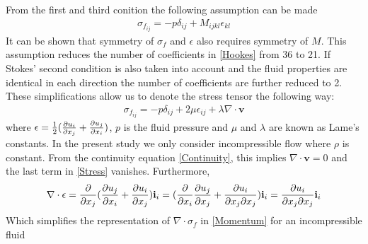 From the first and third conition the following assumption can be made
\begin{align}
\sigma_{f_{ij}} = -p\delta_{ij} + M_{ijkl}\epsilon_{kl} \label{Hookes}
\end{align}
It can be shown that symmetry of $\sigma_f$ and $\epsilon$ also requires symmetry of $M$. This assumption reduces the number of coefficients in \eqref{Hookes} from 36 to 21. If Stokes' second condition is also taken into account and the fluid properties are identical in each direction the number of coefficients are further reduced to 2. These simplifications allow us to denote the stress tensor the following way:
\begin{align}
\sigma_{f_{ij}} = -p\delta_{ij} + 2\mu\epsilon_{ij} + \lambda \nabla \cdot \mathbf{v} \label{Stress}
\end{align}
where $\epsilon = \frac{1}{2}(\frac{\partial u_i}{\partial x_j} + \frac{\partial u_j}{\partial x_i})$, $p$ is the fluid pressure and $\mu$ and $\lambda$ are known as Lame's constants. In the present study we only consider incompressible flow where $\rho$ is constant. From the continuity equation \eqref{Continuity}, this implies $\nabla \cdot \mathbf{v} = 0$ and the last term in \eqref{Stress} vanishes. Furthermore, 
\begin{align*}
\nabla \cdot \epsilon = \frac{\partial }{\partial x_j}(\frac{\partial u_j}{\partial x_i} + \frac{\partial u_i}{\partial x_j})\mathbf{i}_i = (\frac{\partial }{\partial x_i}\frac{\partial u_j}{\partial x_j} + \frac{\partial u_i}{\partial x_j \partial x_j})\mathbf{i}_i = \frac{\partial u_i}{\partial x_j \partial x_j} \mathbf{i}_i
\end{align*}
Which simplifies the representation of $\nabla \cdot \sigma_f$ in \eqref{Momentum} for an incompressible fluid


